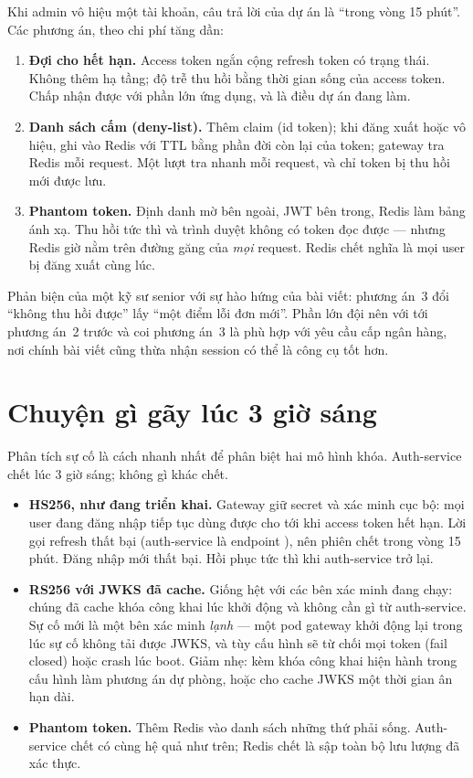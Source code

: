 \begin{decision}
Khi admin vô hiệu một tài khoản, câu trả lời của dự án là ``trong vòng
15 phút''. Các phương án, theo chi phí tăng dần:
\begin{enumerate}
  \item \textbf{Đợi cho hết hạn.} Access token ngắn cộng refresh token
  có trạng thái. Không thêm hạ tầng; độ trễ thu hồi bằng thời gian sống
  của access token. Chấp nhận được với phần lớn ứng dụng, và là điều dự
  án đang làm.
  \item \textbf{Danh sách cấm (deny-list).} Thêm claim  (id
  token); khi đăng xuất hoặc vô hiệu, ghi  vào Redis với TTL
  bằng phần đời còn lại của token; gateway tra Redis mỗi request. Một
  lượt tra nhanh mỗi request, và chỉ token bị thu hồi mới được lưu.
  \item \textbf{Phantom token.} Định danh mờ bên ngoài, JWT bên trong,
  Redis làm bảng ánh xạ. Thu hồi tức thì và trình duyệt không có token
  đọc được --- nhưng Redis giờ nằm trên đường găng của \emph{mọi}
  request. Redis chết nghĩa là mọi user bị đăng xuất cùng lúc.
\end{enumerate}
Phản biện của một kỹ sư senior với sự hào hứng của bài viết: phương
án~3 đổi ``không thu hồi được'' lấy ``một điểm lỗi đơn mới''. Phần lớn
đội nên với tới phương án~2 trước và coi phương án~3 là phù hợp với yêu
cầu cấp ngân hàng, nơi chính bài viết cũng thừa nhận session có thể là
công cụ tốt hơn.
\end{decision}

\section{Chuyện gì gãy lúc 3 giờ sáng}

Phân tích sự cố là cách nhanh nhất để phân biệt hai mô hình khóa.
Auth-service chết lúc 3 giờ sáng; không gì khác chết.

\begin{itemize}
  \item \textbf{HS256, như đang triển khai.} Gateway giữ secret và xác
  minh cục bộ: mọi user đang đăng nhập tiếp tục dùng được cho tới khi
  access token hết hạn. Lời gọi refresh thất bại (auth-service là
  endpoint ), nên phiên chết trong vòng 15 phút. Đăng
  nhập mới thất bại. Hồi phục tức thì khi auth-service trở lại.
  \item \textbf{RS256 với JWKS đã cache.} Giống hệt với các bên xác
  minh đang chạy: chúng đã cache khóa công khai lúc khởi động và không
  cần gì từ auth-service. Sự cố mới là một bên xác minh \emph{lạnh} ---
  một pod gateway khởi động lại trong lúc sự cố không tải được JWKS, và
  tùy cấu hình sẽ từ chối mọi token (fail closed) hoặc crash lúc boot.
  Giảm nhẹ: kèm khóa công khai hiện hành trong cấu hình làm phương án
  dự phòng, hoặc cho cache JWKS một thời gian ân hạn dài.
  \item \textbf{Phantom token.} Thêm Redis vào danh sách những thứ phải
  sống. Auth-service chết có cùng hệ quả như trên; Redis chết là sập
  toàn bộ lưu lượng đã xác thực.
\end{itemize}

